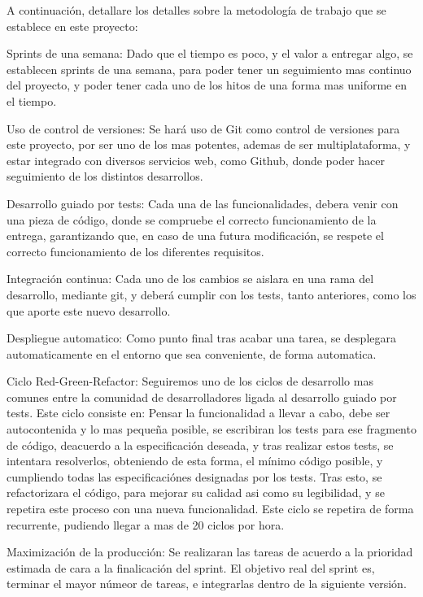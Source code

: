 A continuación, detallare los detalles sobre la metodología de trabajo que se establece en este proyecto:
\begin{definitionlist}
\item[Sprints de una semana:] Dado que el tiempo es poco, y el valor a entregar algo,
se establecen sprints de una semana, para poder tener un seguimiento mas
continuo del proyecto, y poder tener cada uno de los hitos de una forma mas
uniforme en el tiempo.
\item[Uso de control de versiones:] Se hará uso de Git como control de versiones
  para este proyecto, por ser uno de los mas potentes, ademas de ser
  multiplataforma, y estar integrado con diversos servicios web, como Github,
  donde poder hacer seguimiento de los distintos desarrollos. 
\item[Desarrollo guiado por tests:] Cada una de las funcionalidades, debera
  venir con una pieza de código, donde se compruebe el correcto funcionamiento
  de la entrega, garantizando que, en caso de una futura modificación, se
  respete el correcto funcionamiento de los diferentes requisitos.
\item[Integración continua:] Cada uno de los cambios se aislara en una rama del
  desarrollo, mediante git, y deberá cumplir con los tests, tanto anteriores,
  como los que aporte este nuevo desarrollo.
\item[Despliegue automatico:] Como punto final tras acabar una tarea, se
  desplegara automaticamente en el entorno que sea conveniente, de forma automatica.
\item[Ciclo Red-Green-Refactor:] Seguiremos uno de los ciclos de desarrollo mas
  comunes entre la comunidad de desarrolladores ligada al desarrollo guiado por
  tests. Este ciclo consiste en: Pensar la funcionalidad a llevar a cabo, debe
  ser autocontenida y lo mas pequeña posible, se escribiran los tests para ese
  fragmento de código, deacuerdo a la especificación deseada, y tras realizar
  estos tests, se intentara resolverlos, obteniendo de esta forma, el mínimo
  código posible, y cumpliendo todas las especificaciónes designadas por los
  tests. Tras esto, se refactorizara el código, para mejorar su calidad asi como
  su legibilidad, y se repetira este proceso con una nueva funcionalidad.
  Este ciclo se repetira de forma recurrente, pudiendo llegar a mas de 20 ciclos
  por hora.
\item[Maximización de la producción:] Se realizaran las tareas de acuerdo a la
  prioridad estimada de cara a la finalicación del sprint. El objetivo real del
  sprint es, terminar el mayor númeor de tareas, e integrarlas dentro de la
  siguiente versión.
\end{definitionlist}

